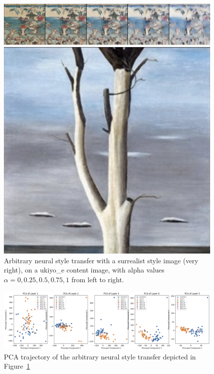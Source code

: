 \documentclass[twocolumn]{article}
\begin{document}
\begin{figure}[H]
    \hfill
    \begin{minipage}{0.75\textwidth}
    \includegraphics[width=\textwidth]{images/ukiyo_e.png}
    \end{minipage}
    \hfill
    \begin{minipage}{0.15\textwidth}
    \includegraphics[width=\textwidth]{images/surrealist.png}
    \end{minipage}
    \hfill\hfill
    \caption{Arbitrary neural style transfer with a surrealist style image (very right), on a ukiyo\_e content image, with alpha values $\alpha=0,0.25,0.5,0.75,1$ from left to right. }
    \label{fig:nstex}
\end{figure}

\begin{figure}[H]
    \centering
    \includegraphics[width=18cm]{images/singletrajectory.png}
    \caption{PCA trajectory of the arbitrary neural style transfer depicted in Figure~\ref{fig:nstex}}
    \label{fig:pcatraj}
\end{figure}
\end{document}
